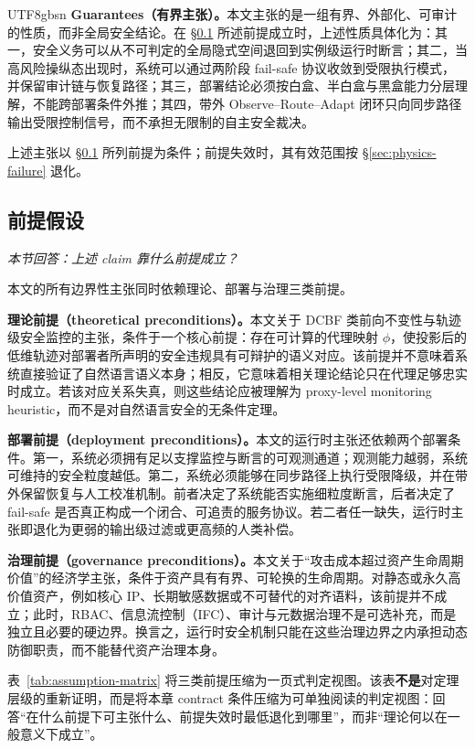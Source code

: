 \documentclass[letterpaper,twocolumn,10pt]{article}
\begin{document}
\begin{CJK}{UTF8}{gbsn}
\textbf{Guarantees（有界主张）。}本文主张的是一组有界、外部化、可审计的性质，而非全局安全结论。在 \S\ref{sec:physics-assumptions} 所述前提成立时，上述性质具体化为：其一，安全义务可以从不可判定的全局隐式空间退回到实例级运行时断言；其二，当高风险操纵态出现时，系统可以通过两阶段 fail-safe 协议收敛到受限执行模式，并保留审计链与恢复路径；其三，部署结论必须按白盒、半白盒与黑盒能力分层理解，不能跨部署条件外推；其四，带外 Observe--Route--Adapt 闭环只向同步路径输出受限控制信号，而不承担无限制的自主安全裁决。

\noindent 上述主张以 \S\ref{sec:physics-assumptions} 所列前提为条件；前提失效时，其有效范围按 \S\ref{sec:physics-failure} 退化。

\subsection{前提假设}
\label{sec:physics-assumptions}

\noindent\textit{本节回答：上述 claim 靠什么前提成立？}

\noindent 本文的所有边界性主张同时依赖理论、部署与治理三类前提。

\noindent\textbf{理论前提（theoretical preconditions）。}本文关于 DCBF 类前向不变性与轨迹级安全监控的主张，条件于一个核心前提：存在可计算的代理映射 $\phi$，使投影后的低维轨迹对部署者所声明的安全违规具有可辩护的语义对应。该前提并不意味着系统直接验证了自然语言语义本身；相反，它意味着相关理论结论只在代理足够忠实时成立。若该对应关系失真，则这些结论应被理解为 proxy-level monitoring heuristic，而不是对自然语言安全的无条件定理。

\smallskip
\noindent\textbf{部署前提（deployment preconditions）。}本文的运行时主张还依赖两个部署条件。第一，系统必须拥有足以支撑监控与断言的可观测通道；观测能力越弱，系统可维持的安全粒度越低。第二，系统必须能够在同步路径上执行受限降级，并在带外保留恢复与人工校准机制。前者决定了系统能否实施细粒度断言，后者决定了 fail-safe 是否真正构成一个闭合、可追责的服务协议。若二者任一缺失，运行时主张即退化为更弱的输出级过滤或更高频的人类补偿。

\smallskip
\noindent\textbf{治理前提（governance preconditions）。}本文关于“攻击成本超过资产生命周期价值”的经济学主张，条件于资产具有有界、可轮换的生命周期。对静态或永久高价值资产，例如核心 IP、长期敏感数据或不可替代的对齐语料，该前提并不成立；此时，RBAC、信息流控制（IFC）、审计与元数据治理不是可选补充，而是独立且必要的硬边界。换言之，运行时安全机制只能在这些治理边界之内承担动态防御职责，而不能替代资产治理本身。

\smallskip
\noindent 表~\ref{tab:assumption-matrix} 将三类前提压缩为一页式判定视图。该表\textbf{不是}对定理层级的重新证明，而是将本章 contract 条件压缩为可单独阅读的判定视图：回答``在什么前提下可主张什么、前提失效时最低退化到哪里''，而非``理论何以在一般意义下成立''。


\end{CJK}
\end{document}
